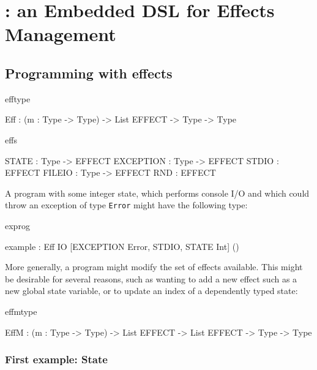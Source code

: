 \section{\Eff{}: an Embedded DSL for Effects Management} 

\subsection{Programming with effects}

\begin{SaveVerbatim}{efftype}

Eff  : (m : Type -> Type) -> List EFFECT -> Type -> Type

\end{SaveVerbatim}

\begin{SaveVerbatim}{effs}

STATE     : Type -> EFFECT
EXCEPTION : Type -> EFFECT
STDIO     : EFFECT
FILEIO    : Type -> EFFECT
RND       : EFFECT

\end{SaveVerbatim}

A program with some integer state, which performs console I/O 
and which could throw
an exception of type \texttt{Error} might have the following type:

\begin{SaveVerbatim}{exprog}

example : Eff IO [EXCEPTION Error, STDIO, STATE Int] ()

\end{SaveVerbatim}

More generally, a program might modify the set of effects available. This
might be desirable for several reasons, such as wanting to add a new effect
such as a new global state variable, or to update an index of a dependently
typed state:

\begin{SaveVerbatim}{effmtype}

EffM : (m : Type -> Type) -> 
       List EFFECT -> List EFFECT -> Type -> Type

\end{SaveVerbatim}


\subsubsection{First example: State}


